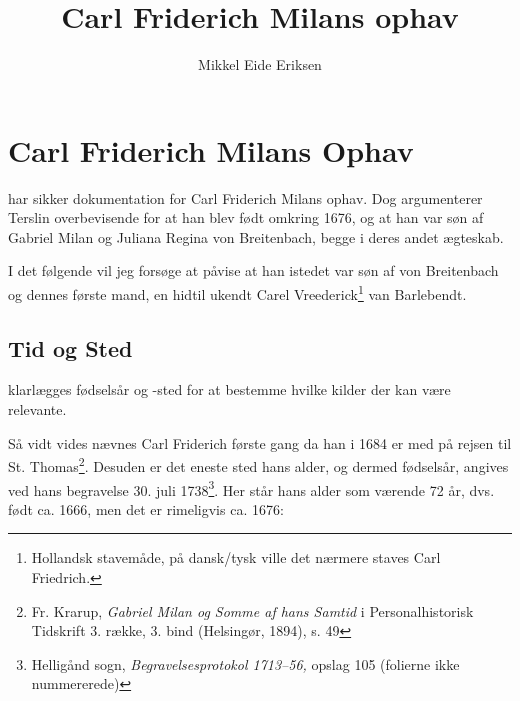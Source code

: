 \documentclass[
	a4paper,
	12pt,
	final
]{memoir}
\author{Mikkel Eide Eriksen}
\title{Carl Friderich Milans ophav}
\begin{document}
\mainmatter

\chapter{Carl Friderich Milans Ophav} %

 har sikker dokumentation for Carl Friderich Milans ophav. Dog argumenterer Terslin overbevisende for at han blev født omkring 1676, og at han var søn af Gabriel Milan og Juliana Regina von Breitenbach, begge i deres andet ægteskab.

I det følgende vil jeg forsøge at påvise at han istedet var søn af von Breitenbach og dennes første mand, en hidtil ukendt Carel Vreederick\footnote{Hollandsk stavemåde, på dansk/tysk ville det nærmere staves Carl Friedrich.} van Barlebendt.

\section{Tid og Sted}

 klarlægges fødselsår og -sted for at bestemme hvilke kilder der kan være relevante.

Så vidt vides nævnes Carl Friderich første gang da han i 1684 er med på rejsen til St. Thomas\footnote{Fr. Krarup, \emph{Gabriel Milan og Somme af hans Samtid} i Personalhistorisk Tidskrift 3. række, 3. bind (Helsingør, 1894), s. 49}. Desuden er det eneste sted hans alder, og dermed fødselsår, angives ved hans begravelse 30. juli 1738\footnote{Helligånd sogn, \emph{Begravelsesprotokol 1713--56,} opslag 105 (folierne ikke nummererede)%
}. Her står hans alder som værende 72 år, dvs. født ca. 1666, men det er rimeligvis ca. 1676:

\end{document}
